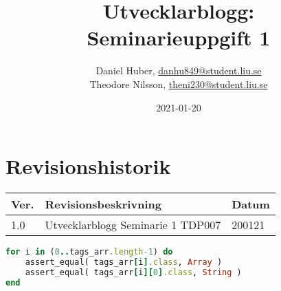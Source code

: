 \documentclass{TDP007mall}
\author{Daniel Huber, \url{danhu849@student.liu.se}\\
  Theodore Nilsson, \url{theni230@student.liu.se}}
\title{Utvecklarblogg:\\Seminarieuppgift 1}
\date{2021-01-20}
\begin{document}
\projectpage
\section*{Revisionshistorik}
\begin{table}[!h]
\begin{tabularx}{\linewidth}{|l|X|l|}
\hline
Ver. & Revisionsbeskrivning & Datum \\\hline
1.0 & Utvecklarblogg Seminarie 1 TDP007 & 200121 \\\hline
\end{tabularx}
\end{table}

  
    


\begin{lstlisting}[language=Ruby]
for i in (0..tags_arr.length-1) do
    assert_equal( tags_arr[i].class, Array )
    assert_equal( tags_arr[i][0].class, String )
end
\end{lstlisting}
\end{document}
